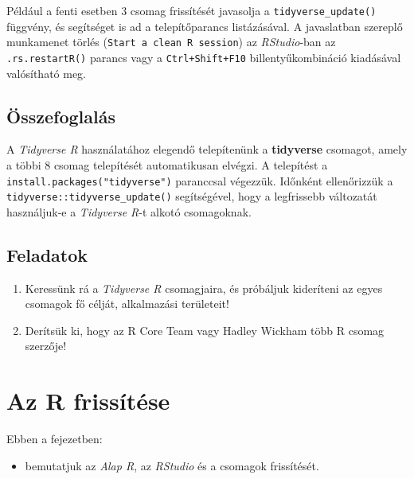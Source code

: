 \documentclass[
]{book}
\makeatletter
\providecommand{\tightlist}{%
  \setlength{\itemsep}{0pt}\setlength{\parskip}{0pt}}
\newenvironment{kframe}{%
\medskip{}
\setlength{\fboxsep}{.8em}
 \def\at@end@of@kframe{}%
 \ifinner\ifhmode%
  \def\at@end@of@kframe{\end{minipage}}%
  \begin{minipage}{\columnwidth}%
 \fi\fi%
 \def\FrameCommand##1{\hskip\@totalleftmargin \hskip-\fboxsep
 \colorbox{shadecolor}{##1}\hskip-\fboxsep
     \hskip-\linewidth \hskip-\@totalleftmargin \hskip\columnwidth}%
 \MakeFramed {\advance\hsize-\width
   \@totalleftmargin\z@ \linewidth\hsize
   \@setminipage}}%
 {\par\unskip\endMakeFramed%
 \at@end@of@kframe}
\newenvironment{rmdblock}[1]
  {
  \begin{itemize}
  \renewcommand{\labelitemi}{
    \raisebox{-.7\height}[0pt][0pt]{
      {\setkeys{Gin}{width=3em,keepaspectratio}\texttt{[image: images/\#1]}}
    }
  }
  \setlength{\fboxsep}{1em}
  \begin{kframe}
  \item
  }
  {
  \end{kframe}
  \end{itemize}
  }
\newenvironment{rmdlevel3}
  {\begin{rmdblock}{level3}}
  {\end{rmdblock}}
\newenvironment{rmdsummary}
  {\begin{rmdblock}{summary}}
  {\end{rmdblock}}
\newenvironment{rmdexercise}
  {\begin{rmdblock}{exercise}}
  {\end{rmdblock}}
\makeatother
\begin{document}
Például a fenti esetben 3 csomag frissítését javasolja a \texttt{tidyverse\_update()} függvény, és segítséget is ad a telepítőparancs listázásával. A javaslatban szereplő munkamenet törlés (\texttt{Start\ a\ clean\ R\ session}) az \emph{RStudio}-ban az \texttt{.rs.restartR()} parancs vagy a \texttt{Ctrl+Shift+F10} billentyűkombináció kiadásával valósítható meg.

\hypertarget{az-r-telepitese-2-summary}{%
\subsection{Összefoglalás}\label{az-r-telepitese-2-summary}}

\begin{rmdsummary}
A \emph{Tidyverse R} használatához elegendő telepítenünk a
\textbf{tidyverse} csomagot, amely a többi 8 csomag telepítését
automatikusan elvégzi. A telepítést a
\texttt{install.packages("tidyverse")} paranccsal végezzük. Időnként
ellenőrizzük a \texttt{tidyverse::tidyverse\_update()} segítségével,
hogy a legfrissebb változatát használjuk-e a \emph{Tidyverse R}-t alkotó
csomagoknak.
\end{rmdsummary}

\hypertarget{az-r-telepitese-2-exercise}{%
\subsection{Feladatok}\label{az-r-telepitese-2-exercise}}

\begin{rmdexercise}
\begin{enumerate}
\def\labelenumi{\arabic{enumi}.}
\tightlist
\item
  Keressünk rá a \emph{Tidyverse R} csomagjaira, és próbáljuk kideríteni az egyes csomagok fő célját, alkalmazási területeit!
\item
  Derítsük ki, hogy az R Core Team vagy Hadley Wickham több R csomag szerzője!
\end{enumerate}
\end{rmdexercise}

\hypertarget{az-r-frissuxedtuxe9se}{%
\section{Az R frissítése}\label{az-r-frissuxedtuxe9se}}

\begin{rmdlevel3}
Ebben a fejezetben:

\begin{itemize}
\tightlist
\item
  bemutatjuk az \emph{Alap R}, az \emph{RStudio} és a csomagok
  frissítését.
\end{itemize}
\end{rmdlevel3}
\end{document}
